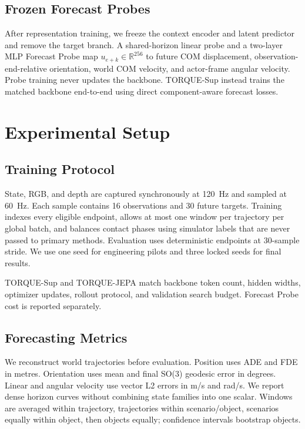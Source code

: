 \documentclass{article}
\begin{document}
\subsection{Frozen Forecast Probes}

After representation training, we freeze the context encoder and latent predictor and remove the target branch. A shared-horizon linear probe and a two-layer MLP Forecast Probe map $u_{e+k}\in\mathbb{R}^{256}$ to future COM displacement, observation-end-relative orientation, world COM velocity, and actor-frame angular velocity. Probe training never updates the backbone. TORQUE-Sup instead trains the matched backbone end-to-end using direct component-aware forecast losses.

\section{Experimental Setup}

\subsection{Training Protocol}

State, RGB, and depth are captured synchronously at 120~Hz and sampled at 60~Hz. Each sample contains 16 observations and 30 future targets. Training indexes every eligible endpoint, allows at most one window per trajectory per global batch, and balances contact phases using simulator labels that are never passed to primary methods. Evaluation uses deterministic endpoints at 30-sample stride. We use one seed for engineering pilots and three locked seeds for final results.

TORQUE-Sup and TORQUE-JEPA match backbone token count, hidden widths, optimizer updates, rollout protocol, and validation search budget. Forecast Probe cost is reported separately.

\subsection{Forecasting Metrics}

We reconstruct world trajectories before evaluation. Position uses ADE and FDE in metres. Orientation uses mean and final SO(3) geodesic error in degrees. Linear and angular velocity use vector L2 errors in m/s and rad/s. We report dense horizon curves without combining state families into one scalar. Windows are averaged within trajectory, trajectories within scenario/object, scenarios equally within object, then objects equally; confidence intervals bootstrap objects.
\end{document}
